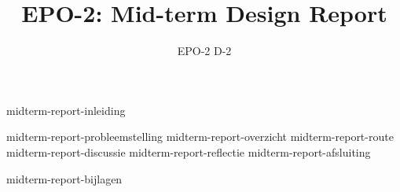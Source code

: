 \documentclass{report}
\title{EPO-2: Mid-term Design Report}
\author{EPO-2 D-2}
\begin{document}
\maketitle
\newpage
{}

{midterm-report-inleiding}
\tableofcontents

\newpage
{}

{midterm-report-probleemstelling}
{midterm-report-overzicht}
{midterm-report-route}
{midterm-report-discussie}
{midterm-report-reflectie}
{midterm-report-afsluiting}

\newpage
{}

\printbibliography
{midterm-report-bijlagen}
\end{document}
